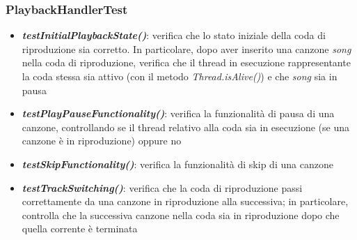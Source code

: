 \documentclass{article}
\begin{document}
  \subsubsection{PlaybackHandlerTest}
  \begin{itemize}

    \item \textbf{\textit{testInitialPlaybackState()}}: verifica che lo stato iniziale della coda di riproduzione sia corretto. In particolare,
    dopo aver inserito una canzone \textit{song} nella coda di riproduzione, verifica che il thread in esecuzione rappresentante la coda stessa sia attivo (con il metodo \textit{Thread.isAlive()}) e che \textit{song} sia in pausa

    \item \textbf{\textit{testPlayPauseFunctionality()}}: verifica la funzionalità di pausa di una canzone, controllando se il thread relativo alla coda sia in esecuzione (se una canzone è in riproduzione) oppure no

    \item \textbf{\textit{testSkipFunctionality()}}: verifica la funzionalità di skip di una canzone

    \item \textbf{\textit{testTrackSwitching()}}: verifica che la coda di riproduzione passi correttamente da una canzone in riproduzione alla successiva; in particolare, controlla che la successiva canzone nella coda sia in riproduzione dopo che quella corrente è terminata

  \end{itemize}
\end{document}
